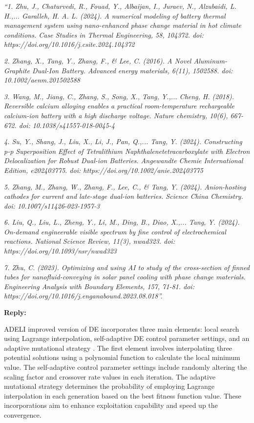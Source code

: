 \documentclass[a4paper,fleqn]{cas-sc}
\begin{document}
\emph{
``1. Zhu, J., Chaturvedi, R., Fouad, Y., Albaijan, I., Juraev, N., Alzubaidi, L. H.,... Garalleh, H. A. L. (2024).
A numerical modeling of battery thermal management system using nano-enhanced phase
change material in hot climate conditions. Case Studies in Thermal Engineering, 58, 104372.
doi: https://doi.org/10.1016/j.csite.2024.104372
}

\emph{
2. Zhang, X., Tang, Y., Zhang, F., \& Lee, C. (2016).
A Novel Aluminum-Graphite Dual-Ion Battery. Advanced energy materials, 6(11), 1502588.
doi: 10.1002/aenm.201502588
}

\emph{
3. Wang, M., Jiang, C., Zhang, S., Song, X., Tang, Y.,... Cheng, H. (2018).
Reversible calcium alloying enables a practical room-temperature rechargeable
calcium-ion battery with a high discharge voltage. Nature chemistry, 10(6), 667-672.
doi: 10.1038/s41557-018-0045-4
}

\emph{
4. Su, Y., Shang, J., Liu, X., Li, J., Pan, Q.,... Tang, Y. (2024).
Constructing p-p Superposition Effect of Tetralithium Naphthalenetetracarboxylate
with Electron Delocalization for Robust Dual-ion Batteries.
Angewandte Chemie International Edition, e202403775.
doi: https://doi.org/10.1002/anie.202403775
}

\emph{
5. Zhang, M., Zhang, W., Zhang, F., Lee, C., \& Tang, Y. (2024).
Anion-hosting cathodes for current and late-stage dual-ion batteries.
Science China Chemistry.
doi: 10.1007/s11426-023-1957-3
}

\emph{
6. Liu, Q., Liu, L., Zheng, Y., Li, M., Ding, B., Diao, X.,... Tang, Y. (2024).
On-demand engineerable visible spectrum by fine control of electrochemical reactions.
National Science Review, 11(3), nwad323.
doi: https://doi.org/10.1093/nsr/nwad323
}

\emph{
7. Zhu, C. (2023).
Optimizing and using AI to study of the cross-section of finned
tubes for nanofluid-conveying in solar panel cooling with phase change materials.
Engineering Analysis with Boundary Elements, 157, 71-81.
doi: https://doi.org/10.1016/j.enganabound.2023.08.018''.
}

\noindent
\textcolor[rgb]{0.51,0.00,0.00}{\textbf{Reply:}}

ADELI improved version of DE incorporates three main elements:
local search using Lagrange interpolation, self-adaptive DE control parameter settings,
and an adaptive mutational strategy \cite{ADELI}.
The first element involves interpolating three potential solutions using a
polynomial function to calculate the local minimum value.
The self-adaptive control parameter settings include randomly altering the
scaling factor and crossover rate values in each iteration.
The adaptive mutational strategy determines the probability of
employing Lagrange interpolation in each generation based on the best fitness function value.
These incorporations aim to enhance exploitation capability and speed up the convergence.
\end{document}
